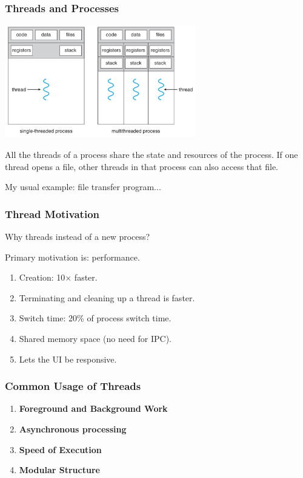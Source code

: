 \begin{frame}
\frametitle{Threads and Processes}

\begin{center}
	\includegraphics[width=0.625\textwidth]{images/mthread2.png}
\end{center}

All the threads of a process share the state and resources of the process. If one thread opens a file, other threads in that process can also access that file.

My usual example: file transfer program...

\end{frame}


\begin{frame}
\frametitle{Thread Motivation}
Why threads instead of a new process?

Primary motivation is: performance.

\begin{enumerate}
	\item Creation: 10$\times$ faster.
	\item Terminating and cleaning up a thread is faster.
	\item Switch time: 20\% of process switch time.
	\item Shared memory space (no need for IPC).
	\item Lets the UI be responsive.
\end{enumerate}

\end{frame}

\begin{frame}
\frametitle{Common Usage of Threads}

\begin{enumerate}
	\item \textbf{Foreground and Background Work}
	\item \textbf{Asynchronous processing}
	\item \textbf{Speed of Execution}
	\item \textbf{Modular Structure}
\end{enumerate}

\end{frame}

